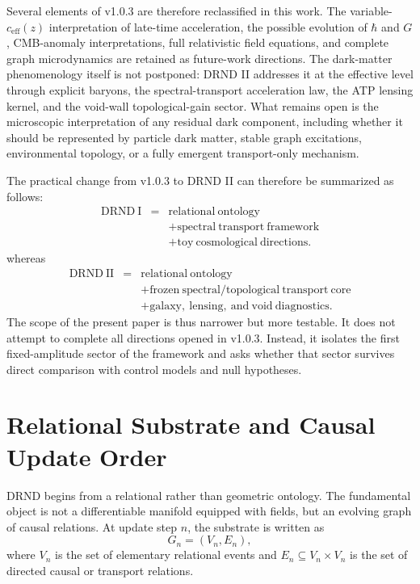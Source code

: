 \documentclass[12pt]{iopart}
\begin{document}
Several elements of v1.0.3 are therefore reclassified in this work. The variable-\(c_{\mathrm{eff}}(z)\) interpretation of late-time acceleration, the possible evolution of \(\hbar\) and \(G\), CMB-anomaly interpretations, full relativistic field equations, and complete graph microdynamics are retained as future-work directions. The dark-matter phenomenology itself is not postponed: DRND II addresses it at the effective level through explicit baryons, the spectral-transport acceleration law, the ATP lensing kernel, and the void-wall topological-gain sector. What remains open is the microscopic interpretation of any residual dark component, including whether it should be represented by particle dark matter, stable graph excitations, environmental topology, or a fully emergent transport-only mechanism.

The practical change from v1.0.3 to DRND II can therefore be summarized as follows:
\begin{eqnarray}
\mathrm{DRND\ I}
&=&
\mathrm{relational\ ontology}
\nonumber\\
&&+
\mathrm{spectral\ transport\ framework}
\nonumber\\
&&+
\mathrm{toy\ cosmological\ directions}.
\nonumber
\end{eqnarray}
whereas
\begin{eqnarray}
\mathrm{DRND\ II}
&=&
\mathrm{relational\ ontology}
\nonumber\\
&&+
\mathrm{frozen\ spectral/topological\ transport\ core}
\nonumber\\
&&+
\mathrm{galaxy,\ lensing,\ and\ void\ diagnostics}.
\nonumber
\end{eqnarray}
The scope of the present paper is thus narrower but more testable. It does not attempt to complete all directions opened in v1.0.3. Instead, it isolates the first fixed-amplitude sector of the framework and asks whether that sector survives direct comparison with control models and null hypotheses.

\section{Relational Substrate and Causal Update Order}
\label{sec:relational_substrate}

DRND begins from a relational rather than geometric ontology. The fundamental object is not a differentiable manifold equipped with fields, but an evolving graph of causal relations. At update step \(n\), the substrate is written as
\begin{equation}
G_n=(V_n,E_n),
\end{equation}
where \(V_n\) is the set of elementary relational events and \(E_n\subseteq V_n\times V_n\) is the set of directed causal or transport relations.
\end{document}
